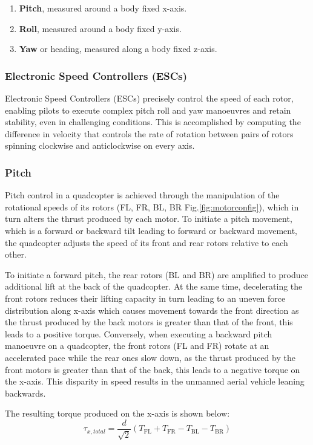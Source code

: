 \documentclass{article}
\begin{document}
\begin{enumerate}
  \item \textbf{Pitch}, measured around a body fixed x-axis.
  \item \textbf{Roll}, measured around a body fixed y-axis.
  \item \textbf{Yaw} or heading, measured along a body fixed z-axis.
\end{enumerate}

\subsubsection{Electronic Speed Controllers (ESCs)}
Electronic Speed Controllers (ESCs) precisely control the speed of each rotor, enabling pilots to execute complex pitch roll and yaw manoeuvres and retain stability, even in challenging conditions. This is accomplished by computing the difference in velocity that controls the rate of rotation between 
pairs of rotors spinning clockwise and anticlockwise on every axis.

\subsubsection{Pitch}
Pitch control in a quadcopter is achieved through the manipulation of the rotational speeds of its rotors (FL, FR, BL, BR Fig.\ref{fig:motorconfig}), which in turn alters the thrust produced by each motor. To initiate a pitch movement, which is a forward or backward 
tilt leading to forward or backward movement, the quadcopter adjusts the speed of its front and rear rotors relative to each other. 

To initiate a forward pitch, the rear rotors (BL and BR) are amplified to produce additional lift at the back of the quadcopter. At the same time, decelerating the front rotors reduces their lifting capacity in turn leading to an uneven force distribution along x-axis which causes movement towards the front direction as the thrust produced by the back motors is greater than that of the front, 
this leads to a positive torque.
Conversely, when executing a backward pitch manoeuvre on a quadcopter, the front rotors (FL and FR) rotate at an accelerated pace while the rear ones slow down, as the thrust produced by the front motors is greater than that of the back, 
this leads to a negative torque on the x-axis. This disparity in speed results in the unmanned aerial vehicle leaning backwards.

The resulting torque produced on the x-axis is shown below:
\begin{equation}
  \tau_{x, total} = \frac{d}{\sqrt{2}} (T_{\text{FL}} + T_{\text{FR}} - T_{\text{BL}} - T_{\text{BR}})
  \label{torque_x}
\end{equation}
\end{document}
